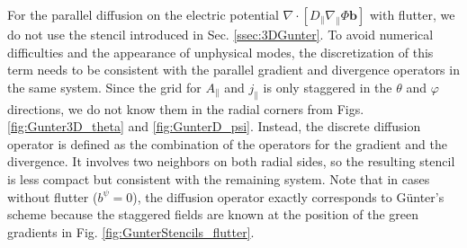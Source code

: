 For the parallel diffusion on the electric potential $\nabla \cdot \left[ D_\parallel \nabla_\parallel \Phi \mathbf{b} \right]$ with flutter, we do not use the stencil introduced in Sec. \ref{ssec:3DGunter}. To avoid numerical difficulties and the appearance of unphysical modes, the discretization of this term needs to be consistent with the parallel gradient and divergence operators in the same system. Since the grid for $A_\parallel$ and $j_\parallel$ is only staggered in the $\theta$ and $\varphi$ directions, we do not know them in the radial corners from Figs. \ref{fig:Gunter3D_theta} and \ref{fig:GunterD_psi}. Instead, the discrete diffusion operator is defined as the combination of the operators for the gradient and the divergence. It involves two neighbors on both radial sides, so the resulting stencil is less compact but consistent with the remaining system. Note that in cases without flutter ($b^\psi = 0$), the diffusion operator exactly corresponds to Günter's scheme \cite{gunter2005} because the staggered fields are known at the position of the green gradients in Fig. \ref{fig:GunterStencils_flutter}.


 




